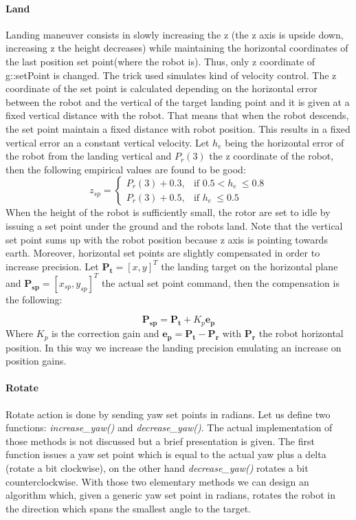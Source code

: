 \paragraph{Land} Landing maneuver consists in slowly increasing the z (the z axis is upside down, increasing z the height decreases) while maintaining the horizontal coordinates of the last position set point(where the robot is). Thus, only z coordinate of g::setPoint is changed. The trick used simulates  kind of velocity control. The z coordinate of the set point is calculated depending on the horizontal error between the robot and the vertical of the target landing point and it is given at a fixed vertical distance with the robot. That means that when the robot descends, the set point maintain a fixed distance with robot position. This results in a fixed vertical error an a constant vertical velocity. Let $h_e$ being the horizontal error of the robot from the landing vertical and $P_r(3)$ the z coordinate of the robot, then the following empirical values are found to be good:
\begin{equation}
z_{sp} = 
\begin{cases}
    P_r(3) + 0.3 , & \text{if } 0.5 <  h_e\ \leq 0.8 \\
    P_r(3) + 0.5  , & \text{if }  h_e\ \leq 0.5
\end{cases}
\label{eq:land}
\end{equation}
When the height of the robot is sufficiently small, the rotor are set to idle by issuing a set point under the ground and the robots land. Note that the vertical set point sums up with the robot position because z axis is pointing towards earth. Moreover, horizontal set points are slightly compensated in order to increase precision. Let $\boldsymbol{P_t} = [x ,y]^T$ the landing target on the horizontal plane and $\boldsymbol{P_{sp}} = [x_{sp} ,y_{sp}]^T$ the actual set point command, then the compensation is the following:

\begin{equation}
\boldsymbol{P_{sp}} = \boldsymbol{P_t} + K_p\boldsymbol{e_p}
\end{equation}
Where $K_p$ is the correction gain and $\boldsymbol{e_p} = \boldsymbol{P_t} - \boldsymbol{P_r}$ with $\boldsymbol{P_r}$ the robot horizontal position. In this way we increase the landing precision emulating an increase on position gains.

\paragraph{Rotate} Rotate action is done by sending yaw set points in radians. Let us define two functions: \textit{increase\_yaw()} and \textit{decrease\_yaw()}. The actual implementation of those methods is not discussed but a brief presentation is given. The first function issues a yaw set point which is equal to the actual yaw plus a delta (rotate a bit clockwise), on the other hand \textit{decrease\_yaw()} rotates a bit counterclockwise. With those two elementary methods we can design an algorithm which, given a generic yaw set point in radians, rotates the robot in the direction which spans the smallest angle to the target. 

